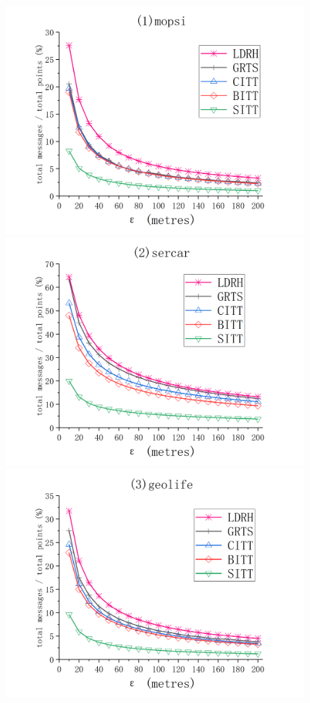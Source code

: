 {\begin{figure}[tb!]
	\centering
	\includegraphics[scale = 0.555]{figures/Fig-mopsi-total-messages.png}\hspace{0ex}
	\includegraphics[scale = 0.555]{figures/Fig-sercar-total-messages.png}\hspace{0ex}
	\includegraphics[scale = 0.555]{figures/Fig-geolife-total-messages.png}\hspace{0ex}

\end{figure}}
